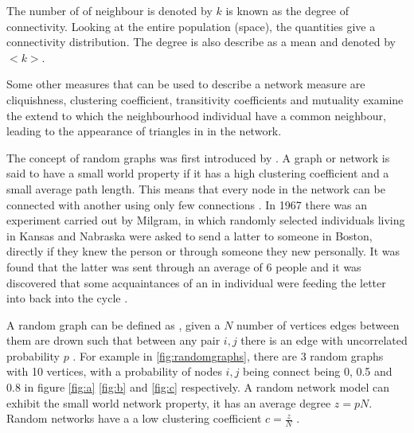 The number of of neighbour is denoted by $k$ is known as the degree of connectivity. Looking at the entire population (space), the quantities  give a connectivity distribution. The degree is also describe as a mean and denoted by $<k>$.

Some other measures that can be used to describe a network measure are cliquishness, clustering coefficient, transitivity  coefficients and mutuality examine the extend to which the neighbourhood individual have a common neighbour,  leading to the appearance of triangles in  in the network.

 The concept of random graphs was first introduced by \cite{erdodblac1959ldquo}. A graph or network is said to have a small world property if it has a high clustering coefficient and a small average path length. This means that every node in the network can be connected with another using only few connections \citep{estrada2015first}. In 1967 there was an experiment carried out by Milgram, in which randomly selected individuals living in Kansas and Nabraska were asked to send a latter to someone in Boston, directly if they knew the person or through someone they new personally. It was found that the latter was sent through an average of 6 people and it was discovered that some acquaintances of an in individual were feeding the letter into back into the cycle \citep{travers1967small}.

A random graph can be defined as , given a $N$ number of vertices edges between them are drown such that between any pair $i,j$ there is an edge with uncorrelated probability $p$ \citep{newman2002random}. For example in \ref{fig:randomgraphs}, there are 3 random graphs with 10 vertices, with a probability of nodes $i,j$ being connect being 0, 0.5 and 0.8 in figure \ref{fig:a} \ref{fig:b} and \ref{fig:c} respectively. A random network model can exhibit the small world network property, it has an average degree $z= pN$. Random networks have a a low clustering coefficient $ c = \frac{z}{N}$ \citep{newman2003structure}.

